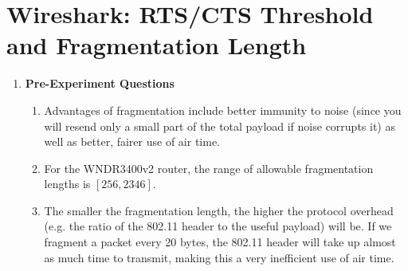 \documentclass[11pt]{article}
\begin{document}
\section{Wireshark: RTS/CTS Threshold and Fragmentation Length}
\begin{enumerate}[label=(\alph*)]
\item {
	\textbf{Pre-Experiment Questions}
	\begin{enumerate}
		\item {Advantages of fragmentation include better immunity to noise (since you will resend only a small part of the total payload if noise corrupts it) as well as better, fairer use of air time.}
		\item {For the WNDR3400v2 router, the range of allowable fragmentation lengths is $[256, 2346]$.}
		\item {The smaller the fragmentation length, the higher the protocol overhead (e.g. the ratio of the 802.11 header to the useful payload) will be. If we fragment a packet every 20 bytes, the 802.11 header will take up almost as much time to transmit, making this a very inefficient use of air time.}
	\end{enumerate}
	
}
\end{enumerate}
\end{document}
